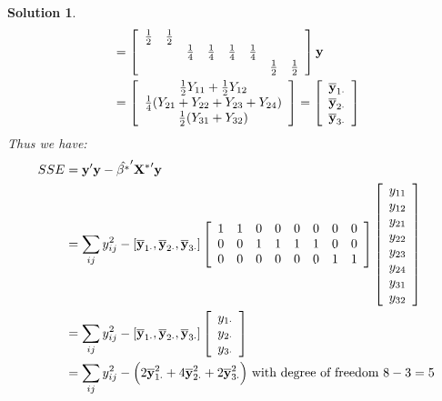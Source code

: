 \documentclass[11pt]{article}
\newtheorem{sol}{Solution}
\begin{document}
\begin{sol}
\begin{align*}
		&= \left[\begin{array}{cccccccc} \frac{1}{2}&\frac{1}{2}&&&&&&\\ &&\frac{1}{4}&\frac{1}{4}&\frac{1}{4}&\frac{1}{4}&&\\ &&&&&&\frac{1}{2}&\frac{1}{2}\end{array}\right]{\bf y}\\
		&= \left[\begin{array}{c} \frac{1}{2}Y_{11} + \frac{1}{2}Y_{12}\\ \frac{1}{4}(Y_{21} + Y_{22} + Y_{23} + Y_{24})\\ \frac{1}{2}(Y_{31} + Y_{32})\end{array}\right] = \left[\begin{array}{c} \overline{{\bf y}}_{1\cdot}\\ \overline{{\bf y}}_{2\cdot}\\ \overline{{\bf y}}_{3\cdot}\end{array}\right]
	\end{align*}
	Thus we have:
	\begin{align*}
		SSE &= {\bf y}'{\bf y} - \hat{\beta^{\ast}}'{\bf X^{\ast}}'{\bf y} \\
		&= \sum_{ij}y_{ij}^2 - [ \overline{{\bf y}}_{1\cdot}, \overline{{\bf y}}_{2\cdot}, \overline{{\bf y}}_{3\cdot}]\left[\begin{array}{cccccccc} 1&1&0&0&0&0&0&0\\ 0&0&1&1&1&1&0&0\\ 0&0&0&0&0&0&1&1\end{array}\right]\left[\begin{array}{c} y_{11}\\ y_{12}\\ y_{21} \\ y_{22}\\y_{23}\\y_{24}\\y_{31}\\y_{32} \end{array}\right]\\
		&= \sum_{ij}y_{ij}^2 - [ \overline{{\bf y}}_{1\cdot}, \overline{{\bf y}}_{2\cdot}, \overline{{\bf y}}_{3\cdot}]\left[\begin{array}{c} y_{1\cdot}\\ y_{2\cdot}\\ y_{3\cdot}\end{array}\right]\\
		&= \sum_{ij}y_{ij}^2 - \Big(2 \overline{{\bf y}}_{1\cdot}^2 + 4 \overline{{\bf y}}_{2\cdot}^2 + 2\overline{{\bf y}}_{3\cdot}^2\Big) \text{ with degree of freedom } 8 - 3 = 5

\end{align*}
\end{sol}
\end{document}
